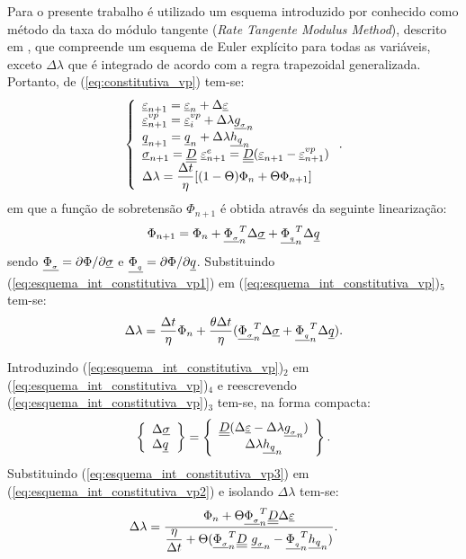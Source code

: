 Para o presente trabalho é utilizado um esquema introduzido por  conhecido como método da taxa do módulo tangente (\textit{Rate Tangente Modulus Method}), descrito em , que compreende um esquema de Euler explícito para todas as variáveis, exceto $\Delta \lambda$ que é integrado de acordo com a regra trapezoidal generalizada. Portanto, de (\ref{eq:constitutiva_vp}) tem-se:
\begin{equation}
	\label{eq:esquema_int_constitutiva_vp}
	\left\{
	\begin{array}{lcl}
		\underline{\varepsilon}_{n+1} = \underline{\varepsilon}_n + \Delta \underline{\varepsilon} \\
		\underline{\varepsilon}_{n+1}^{vp} = \underline{\varepsilon}_i^{vp} + \Delta \lambda \underline{g_{_\sigma}}_n \\
		\underline q_{n+1} = \underline q_n + \Delta \lambda \underline{h_q}_n \\	
		\underline \sigma_{n+1} = \underline{\underline D}~\underline{\varepsilon}_{n+1}^e = \underline{\underline D}(\underline{\varepsilon}_{n+1} - \underline{\varepsilon}_{n+1}^{vp}) \\
		\Delta \lambda = \dfrac{\Delta t}{\eta}[(1-\Theta)\Phi_n + \Theta \Phi_{n+1}]
	\end{array}
	\right..
\end{equation}
em que a função de sobretensão $\Phi_{n+1}$ é obtida através da seguinte linearização:
\begin{equation}
	\label{eq:esquema_int_constitutiva_vp1}
	\Phi_{n+1} = \Phi_n + \underline{\Phi_{_\sigma}}_n^T \Delta \underline \sigma + \underline{\Phi_{_q}}_n^T \Delta \underline q
\end{equation}
sendo $\underline{\Phi_{_\sigma}} = \partial \Phi / \partial \underline \sigma$ e $\underline{\Phi_{_q}} = \partial \Phi / \partial \underline q$. Substituindo (\ref{eq:esquema_int_constitutiva_vp1}) em (\ref{eq:esquema_int_constitutiva_vp})$_5$ tem-se:
\begin{equation}
	\label{eq:esquema_int_constitutiva_vp2}
	\Delta \lambda = \dfrac{\Delta t}{\eta} \Phi_n + \dfrac{\theta \Delta t}{\eta}(\underline{\Phi_{_\sigma}}_n^T \Delta \underline \sigma + \underline{\Phi_{_q}}_n^T \Delta \underline q).
\end{equation}

Introduzindo (\ref{eq:esquema_int_constitutiva_vp})$_2$ em (\ref{eq:esquema_int_constitutiva_vp})$_4$ e reescrevendo (\ref{eq:esquema_int_constitutiva_vp})$_3$ tem-se, na forma compacta:
\begin{equation}
	\label{eq:esquema_int_constitutiva_vp3}
	\left\{ \begin{array}{lcl} \Delta \underline \sigma \\ \Delta \underline q \end{array} \right\} = \left\{ \begin{array}{ccc} \underline{\underline D}(\Delta\underline{\varepsilon} -\Delta \lambda \underline{g_{_\sigma}}_n) \\ \Delta \lambda \underline{h_q}_n \end{array} \right\}.
\end{equation}
Substituindo (\ref{eq:esquema_int_constitutiva_vp3}) em (\ref{eq:esquema_int_constitutiva_vp2}) e isolando $\Delta \lambda$ tem-se:
\begin{equation}
	\label{eq:esquema_int_constitutiva_vp4}
	\Delta \lambda = \dfrac{\Phi_n + \Theta \underline{\Phi_{_\sigma}}_n^T\underline{\underline D}\Delta\underline{\varepsilon}}{\dfrac{\eta}{\Delta t} + \Theta (\underline{\Phi_{_\sigma}}_n^T\underline{\underline D}~\underline{g_{_\sigma}}_n - \underline{\Phi_{_q}}_n^T \underline{h_q}_n)}.
\end{equation}

